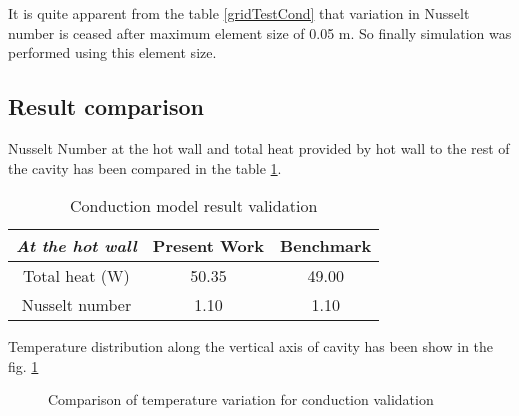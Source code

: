 It is quite apparent from the table \ref{gridTestCond} that variation in Nusselt number is ceased after maximum element size of 0.05 m. So finally simulation was performed using this element size.

\subsection{Result comparison}
Nusselt Number at the hot wall and total heat provided by hot wall to the rest of the cavity has been compared in the table \ref{tab:conductionModelResultValidation}.
	
\begin{table}[H]
\centering
\caption{Conduction model result validation}
\label{tab:conductionModelResultValidation}
\begin{tabular}{@{}|c|c|c|@{}}
\toprule
\textit{\textbf{At the hot wall}} & \textbf{Present Work} & \textbf{Benchmark} \\ \midrule
Total heat (W)                    & 50.35                 & 49.00              \\ \midrule
Nusselt number                    & 1.10                  & 1.10               \\ \bottomrule
\end{tabular}
\end{table}

Temperature distribution along the vertical axis of cavity has been show in the fig. \ref{fig:validationConduction}


\begin{figure}[H]
\centering     %
{}
\caption{Comparison of temperature variation for conduction validation}
\label{fig:validationConduction}
\end{figure}

